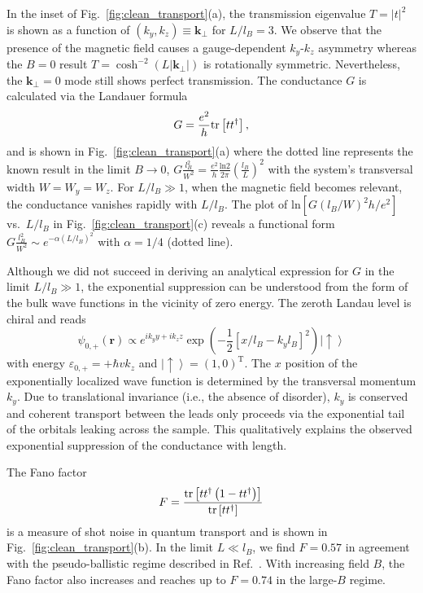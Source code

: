\documentclass[aps,prb,10pt,amsmath,amssymb,twocolumn,floatfix,superscriptaddress,showpacs,numerical,footinbib]{revtex4-1}
\begin{document}
In the inset of Fig.~\ref{fig:clean_transport}(a), the transmission eigenvalue
$T=|t|^{2}$ is shown as a function of $(k_{y},k_{z})\equiv \mathbf{k}_\perp$ for $L/l_{B}=3$.
We observe that the presence of the magnetic field causes a gauge-dependent $k_{y}$-$k_{z}$ asymmetry whereas the $B=0$ result $T=\cosh^{-2}\left(L|\mathbf{k_\perp}|\right)$\cite{Sbierski2014a} is rotationally symmetric. Nevertheless, the $\mathbf{k_\perp}=0$ mode still shows perfect transmission. The conductance $G$ is calculated via the Landauer formula
\begin{equation}
G = \frac{e^2}{h} {\rm tr}\left[ t t^\dagger\right],
\label{eq:G}
\end{equation}
and is shown in Fig.~\ref{fig:clean_transport}(a) where
the dotted line represents the known result in the limit $B\rightarrow0$, $G\frac{l_{B}^{2}}{W^{2}}=\frac{e^2}{h}\frac{\mathrm{ln}2}{2\pi}\left(\frac{l_{B}}{L}\right)^{2}$\cite{Sbierski2014a} with the system's transversal width $W=W_y=W_z$.
For $L/l_{B}\gg 1$, when the magnetic field becomes relevant,
the conductance vanishes rapidly with $L/l_{B}$. The plot of $\mathrm{ln}[G \left(l_{B}/W\right)^{2} h/e^2]$
vs.\ $L/l_{B}$ in Fig.~\ref{fig:clean_transport}(c) reveals a functional
form $G\frac{l_{B}^{2}}{W^{2}}\sim e^{-\alpha(L/l_{B})^{2}}$ with
$\alpha=1/4$ (dotted line). 

Although we did not succeed in deriving an analytical expression for $G$ in the limit $L/l_{B}\gg 1$, the exponential suppression can be understood from the form of the bulk wave functions in the vicinity of zero energy.
%
The zeroth Landau level is chiral and reads
\begin{equation}
 \psi_{0,+}\left(\mathbf{r}\right) \propto e^{ik_{y}y+ik_{z}z} \exp\left(-\frac{1}{2}\left[x/l_{B}-k_{y}l_{B}\right]^{2}\right)\left|\uparrow\right\rangle
\end{equation}
%
with energy $\varepsilon_{0,+}=+\hbar v k_{z}$ and $\left|\uparrow\right\rangle = (1,0)^{\mathrm{T}}$.
%
The $x$ position of the exponentially localized wave function is determined
by the transversal momentum $k_{y}$. Due to translational invariance
(i.e., the absence of disorder), $k_{y}$ is conserved and coherent
transport between the leads only proceeds via the exponential tail
of the orbitals leaking across the sample. This qualitatively explains the observed exponential suppression of the conductance with length.

The Fano factor
\begin{equation}
F = \frac{{\rm tr}\left[t t^\dagger \left(1 - t t^\dagger\right)\right]}{{\rm tr}\left[t t^\dagger\right]}
\label{eq:F}
\end{equation}
is a measure of shot noise in quantum transport\cite{Datta1997} and is shown in Fig.~\ref{fig:clean_transport}(b). In the limit $L \ll l_B$, we find $F = 0.57$ in agreement with the pseudo-ballistic regime described in Ref.~. With increasing field $B$, the Fano factor also increases and reaches up to $F = 0.74$ in the large-$B$ regime.
\end{document}
